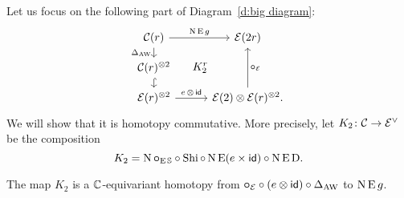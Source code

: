Let us focus on the following part of Diagram~\eqref{d:big diagram}:
\begin{equation}\label{d:K2}
	\begin{tikzcd}[row sep=small]
		\cC(r)
		\arrow[r,"\chains\EE g"]
		\arrow[d,"\Delta_{\AW}"']
		\arrow[ddr,phantom,"K_2^r",shift left=0pt]
		&[5pt] \BE(2r)
		\\
		\cC(r)^{\ot 2}
		\arrow[d,hook] & \\
		\BE(r)^{\ot 2}
		\arrow[r,"e\, \ot\, \id"]
		& \BE(2) \ot \BE(r)^{\ot 2}.
		\arrow[uu,"\bcomp_\BE"']
	\end{tikzcd}
\end{equation}
We will show that it is homotopy commutative.
More precisely, let $K_2 \colon \mathcal{C} \to \mathcal{E}^\vee$ be the composition
\[
K_2 = \operatorname{N}\bm{\mathbin{\circ}}_{\operatorname{E}\mathbb{S}} \mathbin{\circ} \operatorname{Shi} \mathbin{\circ} \operatorname{N}\operatorname{E}(e \times \mathsf{id}) \mathbin{\circ} \operatorname{N}\operatorname{E}\mathrm{D}.
\]

\begin{lemma}\label{l:K2}
	The map $K_2$ is a $\mathbb{C}$-equivariant homotopy from $\bm{\mathbin{\circ}}_{\mathcal{E}} \mathbin{\circ} (e \otimes \mathsf{id}) \mathbin{\circ} \Delta_{\operatorname{AW}}$ to $\operatorname{N}\operatorname{E} g$.
\end{lemma}

